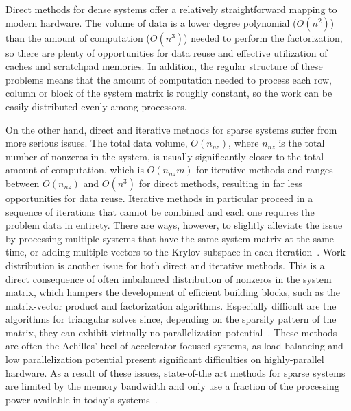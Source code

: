 Direct methods for dense systems offer a relatively straightforward mapping to
modern hardware. The volume of data is a lower degree polynomial
($O(n^2)$) than the amount of computation ($O(n^3)$) needed to perform the
factorization, so there are plenty of opportunities for data reuse and effective
utilization of caches and scratchpad memories. In addition, the regular
structure of these problems means that the amount of computation needed to
process each row, column or block of the system matrix is roughly constant, so
the work can be easily distributed evenly among processors.

On the other hand, direct and iterative methods for sparse systems suffer from
more serious issues. The total data volume, $O(n_{nz})$, where $n_{nz}$ is
the total number of nonzeros in the system, is usually significantly closer to
the total amount of computation, which is $O(n_{nz} m)$ for iterative
methods and ranges between $O(n_{nz})$ and $O(n^3)$ for direct methods,
resulting in far less opportunities for data reuse. Iterative methods in
particular proceed in a sequence of iterations that cannot be combined and each
one requires the problem data in entirety. There are ways, however, to slightly
alleviate the issue by processing multiple systems that have the same system
matrix at the same time, or adding multiple vectors to the Krylov subspace in
each iteration~\cite{ca-gmres}. Work distribution is another issue for both
direct and iterative methods. This is a direct consequence of often imbalanced
distribution of nonzeros in the system matrix, which hampers the development of
efficient building blocks, such as the matrix-vector product and factorization
algorithms. Especially difficult are the algorithms for triangular solves since,
depending on the sparsity pattern of the matrix, they can exhibit virtually no
parallelization potential~\cite{triangular-solves}. These methods are often the
Achilles' heel of accelerator-focused systems, as load balancing and low
parallelization potential present significant difficulties on highly-parallel
hardware.  As a result of these issues, state-of-the art methods for sparse
systems are limited by the memory bandwidth and only use a fraction of the
processing power available in today's systems~\cite{top500}.
